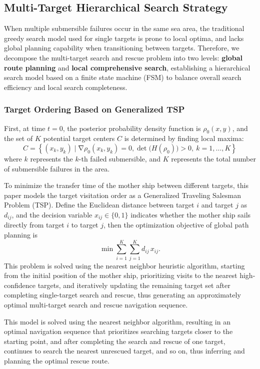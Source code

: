 \documentclass{mcmthesis}
\begin{document}
\subsection{Multi-Target Hierarchical Search Strategy}
When multiple submersible failures occur in the same sea area,
the traditional greedy search model used for single targets is prone to local optima,
and lacks global planning capability when transitioning between targets.
Therefore, we decompose the multi-target search and rescue problem into two levels: \textbf{global route planning} and \textbf{local comprehensive search},
establishing a hierarchical search model based on a finite state machine (FSM) to balance overall search efficiency and local search completeness.
\subsubsection*{Target Ordering Based on Generalized TSP}
First, at time $t=0$, the posterior probability density function is $\rho_0(x,y)$,
and the set of $K$ potential target centers $C$ is determined by finding local maxima:
\begin{equation}
  C=\left\{(x_k,y_k)\mid\mathrm{\nabla}\rho_0(x_k,y_k)=0,\det\big(H(\rho_0)\big)>0,\ k=1,\ldots,K\right\}
\end{equation}
where $k$ represents the $k$-th failed submersible, and $K$ represents the total number of submersible failures in the area.

To minimize the transfer time of the mother ship between different targets,
this paper models the target visitation order as a Generalized Traveling Salesman Problem (TSP).
Define the Euclidean distance between target $i$ and target $j$ as $d_{ij}$,
and the decision variable $x_{ij}\in\{0,1\}$ indicates whether the mother ship sails directly from target $i$ to target $j$,
then the optimization objective of global path planning is
\begin{equation}
  \min \sum_{i=1}^{K}\sum_{j=1}^{K} d_{ij}\,x_{ij}.
\end{equation}
This problem is solved using the nearest neighbor heuristic algorithm,
starting from the initial position of the mother ship,
prioritizing visits to the nearest high-confidence targets,
and iteratively updating the remaining target set after completing single-target search and rescue,
thus generating an approximately optimal multi-target search and rescue navigation sequence.

This model is solved using the nearest neighbor algorithm,
resulting in an optimal navigation sequence that prioritizes searching targets closer to the starting point,
and after completing the search and rescue of one target, continues to search the nearest unrescued target, and so on, thus inferring and planning the optimal rescue route.
\end{document}
